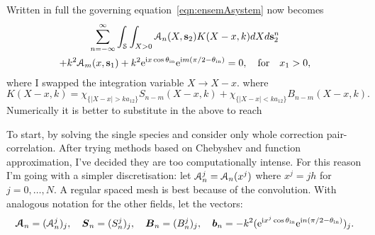 \documentclass[12pt, a4paper]{article}
\begin{document}
Written in full the governing equation~\eqref{eqn:ensemAsystem} now becomes
\begin{multline}
 \sum_{n=-\infty}^\infty \int_\mathcal S
  \int_{X> 0} \mathcal A_n (X, \mathbf s_2) K(X - x,k) dX
  d\mathbf s_2^n
\\
+  k^2 \mathcal A_m (x, \mathbf s_1)   + k^2  \textrm{e}^{\textrm{i} x \cos \theta_{\mathrm{in}}} \textrm{e}^{\textrm{i} m ( \pi/2 - \theta_{\mathrm{in}} )}
   = 0, \quad \text{for} \quad x_1 >0,
  \label{eqn:ensemAsystem2}
\end{multline}
where I swapped the integration variable $X \to X - x$.
where
\begin{equation}
K(X-x,k) =   \chi_{\{ |X-x|> k a_{12}\}}  S_{n-m}(X-x,k)
 + \chi_{\{ |X - x|< k a_{12}\}}   B_{n-m}(X- x,k).
\label{eqn:kernel}
\end{equation}
Numerically it is better to substitute in the above to reach

To start, by solving the single species and consider only whole correction pair-correlation. After trying methods based on Chebyshev and function approximation, I've decided they are too computationally intense. For this reason I'm going with a simpler discretisation: let $\mathcal A_n^j = \mathcal A_n (x^j)$ where $x^j = j h$ for $j=0,\ldots,N$. A regular spaced mesh is best because of the convolution. With analogous notation for the other fields, let the vectors:
\begin{equation}
  \boldsymbol{\mathcal A}_n = (\mathcal A_n^j)_j, \quad \boldsymbol{S}_n = (S_n^j)_j, \quad \boldsymbol{B}_n = (B_n^j)_j, \quad \boldsymbol{b}_n = - k^2(\textrm{e}^{ \textrm{i} x^j \cos \theta_{\mathrm{in}}} \textrm{e}^{\textrm{i} n ( \pi/2 - \theta_{\mathrm{in}} )})_j.
\end{equation}
\end{document}

